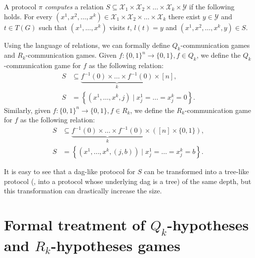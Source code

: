 A protocol $\pi$ \emph{computes} a relation $S\subseteq \mathcal{X}_1\times\mathcal{X}_2\times\ldots\times \mathcal{X}_k\times\mathcal{Y}$ if the following holds. For every $(x^1, x^2, \ldots, x^k) \in  \mathcal{X}_1\times\mathcal{X}_2\times\ldots\times \mathcal{X}_k$ there exist $y\in \mathcal{Y}$ and $t\in T(G)$ such that $(x^1, \ldots, x^k)$ visits $t$, $l(t) = y$ and $(x^1, x^2, \ldots, x^k, y) \in S$.

Using the language of relations, we can formally define $Q_k$-communication games and $R_k$-communication games.  %
Given  %
$f\colon\{0, 1\}^n\to\{0,1\}, f\in Q_k$, we define the $Q_k$-communication game for $f$ as the following relation:
\begin{align*}
S &\subseteq \underbrace{f^{-1}(0) \times \ldots \times f^{-1}(0)}_k \times [n], \\
 S &= \left\{(x^1, \ldots, x^k, j) \mid x^1_j  = \ldots = x^k_j = 0\right\}.
\end{align*}
Similarly, given $f\colon\{0, 1\}^n\to\{0,1\}, f\in R_k$, we define the $R_k$-communication game for $f$ as the following relation:
\begin{align*}
S &\subseteq \underbrace{f^{-1}(0) \times \ldots \times f^{-1}(0)}_k \times ([n]\times\{0,1\}), \\
 S &= \left\{(x^1, \ldots, x^k, (j, b)) \mid x^1_j  = \ldots = x^k_j = b\right\}.
\end{align*}

It is easy to see that a dag-like protocol for $S$ can be transformed into a tree-like protocol (\ie, into a protocol whose underlying dag is a tree) of the same depth, but this transformation can drastically increase the size.


\section{Formal treatment of $Q_k$-hypotheses and $R_k$-hypotheses games} 
\label{sec:hypotheses_games}

